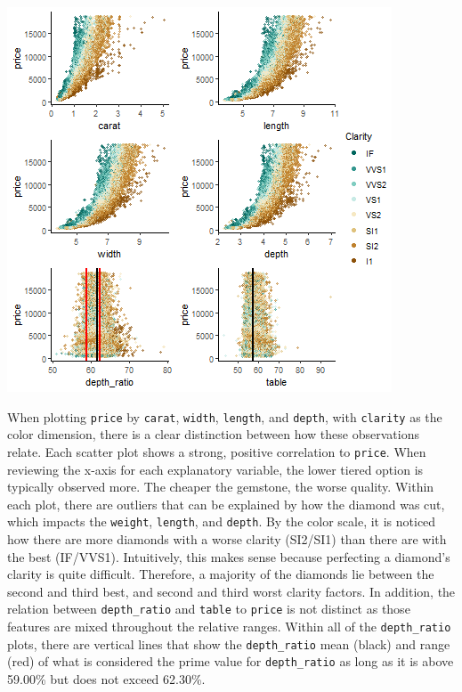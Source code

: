 \documentclass[
  paper=a4,
  ,captions=tableheading
]{scrartcl}
\begin{document}
\begin{center}\includegraphics{Diamonds_PDF_files/figure-latex/Price by X and Clarity-1} \end{center}

When plotting \texttt{price} by \texttt{carat}, \texttt{width},
\texttt{length}, and \texttt{depth}, with \texttt{clarity} as the color
dimension, there is a clear distinction between how these observations
relate. Each scatter plot shows a strong, positive correlation to
\texttt{price}. When reviewing the x-axis for each explanatory variable,
the lower tiered option is typically observed more. The cheaper the
gemstone, the worse quality. Within each plot, there are outliers that
can be explained by how the diamond was cut, which impacts the
\texttt{weight}, \texttt{length}, and \texttt{depth}. By the color
scale, it is noticed how there are more diamonds with a worse clarity
(SI2/SI1) than there are with the best (IF/VVS1). Intuitively, this
makes sense because perfecting a diamond's clarity is quite difficult.
Therefore, a majority of the diamonds lie between the second and third
best, and second and third worst clarity factors. In addition, the
relation between \texttt{depth\_ratio} and \texttt{table} to
\texttt{price} is not distinct as those features are mixed throughout
the relative ranges. Within all of the \texttt{depth\_ratio} plots,
there are vertical lines that show the \texttt{depth\_ratio} mean
(black) and range (red) of what is considered the prime value for
\texttt{depth\_ratio} as long as it is above 59.00\% but does not exceed
62.30\%.
\end{document}
